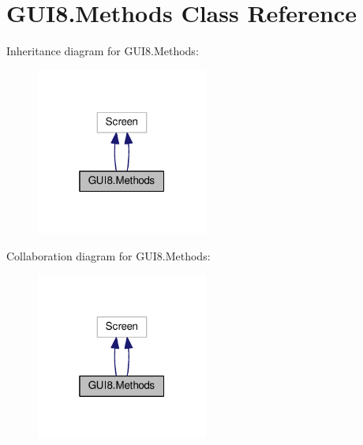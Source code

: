 \hypertarget{classGUI8_1_1Methods}{}\section{G\+U\+I8.\+Methods Class Reference}
\label{classGUI8_1_1Methods}


Inheritance diagram for G\+U\+I8.\+Methods\+:\nopagebreak
\begin{figure}[H]
\begin{center}
\leavevmode
\includegraphics[width=160pt]{classGUI8_1_1Methods__inherit__graph}
\end{center}
\end{figure}


Collaboration diagram for G\+U\+I8.\+Methods\+:\nopagebreak
\begin{figure}[H]
\begin{center}
\leavevmode
\includegraphics[width=160pt]{classGUI8_1_1Methods__coll__graph}
\end{center}
\end{figure}
